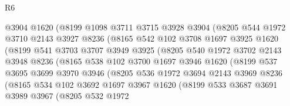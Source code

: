 \begin{lexlean}{R6}
\begin{coremodule}
                    @3904
                    @1620
                    (@8199
                      @1098
                      @3711
                      @3715
                      @3928
                      @3904
                      (@8205
                        @544
                        @1972
                        @3710
                        @2143
                        @3927
                        @8236
                        (@8165
                          @542
                          @102
                          @3708
                          @1697
                          @3925
                          @1620
                          (@8199
                            @541
                            @3703
                            @3707
                            @3949
                            @3925
                            (@8205
                              @540
                              @1972
                              @3702
                              @2143
                              @3948
                              @8236
                              (@8165
                                @538
                                @102
                                @3700
                                @1697
                                @3946
                                @1620
                                (@8199
                                  @537
                                  @3695
                                  @3699
                                  @3970
                                  @3946
                                  (@8205
                                    @536
                                    @1972
                                    @3694
                                    @2143
                                    @3969
                                    @8236
                                    (@8165
                                      @534
                                      @102
                                      @3692
                                      @1697
                                      @3967
                                      @1620
                                      (@8199
                                        @533
                                        @3687
                                        @3691
                                        @3989
                                        @3967
                                        (@8205
                                          @532
                                          @1972

\end{coremodule}
\end{lexlean}
